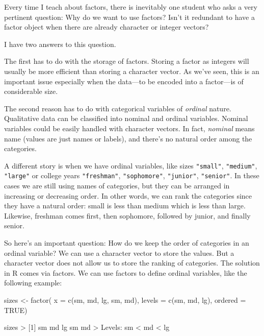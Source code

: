 \documentclass[
]{book}
\newenvironment{Shaded}{\begin{snugshade}}{\end{snugshade}}
\newcommand{\AttributeTok}[1]{\textcolor[rgb]{0.77,0.63,0.00}{#1}}
\newcommand{\ConstantTok}[1]{\textcolor[rgb]{0.00,0.00,0.00}{#1}}
\newcommand{\DecValTok}[1]{\textcolor[rgb]{0.00,0.00,0.81}{#1}}
\newcommand{\FunctionTok}[1]{\textcolor[rgb]{0.00,0.00,0.00}{#1}}
\newcommand{\NormalTok}[1]{#1}
\newcommand{\OtherTok}[1]{\textcolor[rgb]{0.56,0.35,0.01}{#1}}
\newcommand{\SpecialCharTok}[1]{\textcolor[rgb]{0.00,0.00,0.00}{#1}}
\newcommand{\StringTok}[1]{\textcolor[rgb]{0.31,0.60,0.02}{#1}}
\begin{document}
Every time I teach about factors, there is inevitably one student who asks a
very pertinent question: Why do we want to use factors? Isn't it redundant to
have a factor object when there are already character or integer vectors?

I have two answers to this question.

The first has to do with the storage of factors. Storing a factor as integers
will usually be more efficient than storing a character vector. As we've seen,
this is an important issue especially when the data---to be encoded into a
factor---is of considerable size.

The second reason has to do with categorical variables of \emph{ordinal} nature.
Qualitative data can be classified into nominal and ordinal variables. Nominal
variables could be easily handled with character vectors. In fact, \emph{nominal}
means name (values are just names or labels), and there's no natural order
among the categories.

A different story is when we have ordinal variables, like sizes \texttt{"small"},
\texttt{"medium"}, \texttt{"large"} or college years \texttt{"freshman"}, \texttt{"sophomore"}, \texttt{"junior"},
\texttt{"senior"}. In these cases we are still using names of categories, but they
can be arranged in increasing or decreasing order. In other words, we can rank
the categories since they have a natural order: small is less than medium which
is less than large. Likewise, freshman comes first, then sophomore, followed by
junior, and finally senior.

So here's an important question: How do we keep the order of categories in an
ordinal variable? We can use a character vector to store the values. But a
character vector does not allow us to store the ranking of categories. The
solution in R comes via factors. We can use factors to define ordinal variables,
like the following example:

\begin{Shaded}
\begin{Highlighting}[]
\NormalTok{sizes }\OtherTok{\textless{}{-}} \FunctionTok{factor}\NormalTok{(}
  \AttributeTok{x =} \FunctionTok{c}\NormalTok{(}\StringTok{\textquotesingle{}sm\textquotesingle{}}\NormalTok{, }\StringTok{\textquotesingle{}md\textquotesingle{}}\NormalTok{, }\StringTok{\textquotesingle{}lg\textquotesingle{}}\NormalTok{, }\StringTok{\textquotesingle{}sm\textquotesingle{}}\NormalTok{, }\StringTok{\textquotesingle{}md\textquotesingle{}}\NormalTok{),}
  \AttributeTok{levels =} \FunctionTok{c}\NormalTok{(}\StringTok{\textquotesingle{}sm\textquotesingle{}}\NormalTok{, }\StringTok{\textquotesingle{}md\textquotesingle{}}\NormalTok{, }\StringTok{\textquotesingle{}lg\textquotesingle{}}\NormalTok{),}
  \AttributeTok{ordered =} \ConstantTok{TRUE}\NormalTok{)}

\NormalTok{sizes}
\SpecialCharTok{\textgreater{}}\NormalTok{ [}\DecValTok{1}\NormalTok{] sm md lg sm md}
\SpecialCharTok{\textgreater{}}\NormalTok{ Levels}\SpecialCharTok{:}\NormalTok{ sm }\SpecialCharTok{\textless{}}\NormalTok{ md }\SpecialCharTok{\textless{}}\NormalTok{ lg}
\end{Highlighting}
\end{Shaded}
\end{document}
